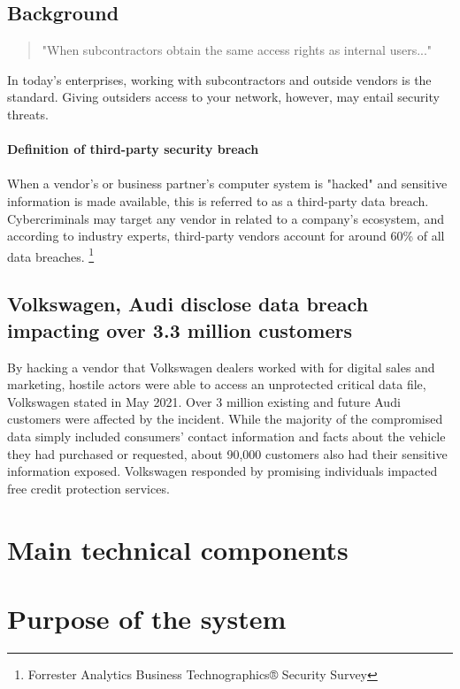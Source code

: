 \documentclass[12pt,a4paper]{article}
\begin{document}
\subsection{Background}
\begin{quote}
    "When subcontractors obtain the same access rights as internal users..."
\end{quote}
\begin{justify}
In today's enterprises, working with subcontractors and outside vendors is the standard. Giving outsiders access to your network, however, may entail security threats.\\ \\
\textbf{Definition of third-party security breach} \\ \\
When a vendor's or business partner's computer system is "hacked" and sensitive information is made available, this is referred to as a third-party data breach. Cybercriminals may target any vendor in related to a company's ecosystem, and according to industry experts, third-party vendors account for around 60\% of all data breaches.
\footnote{ Forrester Analytics Business Technographics® Security Survey}
\end{justify}
 \subsection{Volkswagen, Audi disclose data breach impacting over 3.3 million customers}
 \begin{justify}
 By hacking a vendor that Volkswagen dealers worked with for digital sales and marketing, hostile actors were able to access an unprotected critical data file, Volkswagen stated in May 2021. Over 3 million existing and future Audi customers were affected by the incident. 
While the majority of the compromised data simply included consumers' contact information and facts about the vehicle they had purchased or requested, about 90,000 customers also had their sensitive information exposed. Volkswagen responded by promising individuals impacted free credit protection services.    
 \end{justify}
\section{Main technical components}
\section{Purpose of the system}
\end{document}
